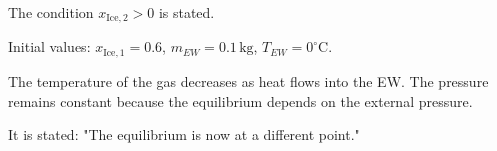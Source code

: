 The condition \( x_{\text{Ice},2} > 0 \) is stated.  

Initial values:  
\( x_{\text{Ice},1} = 0.6 \), \( m_{EW} = 0.1 \, \text{kg} \), \( T_{EW} = 0^\circ \text{C} \).  

The temperature of the gas decreases as heat flows into the EW. The pressure remains constant because the equilibrium depends on the external pressure.  

It is stated:  
"The equilibrium is now at a different point."